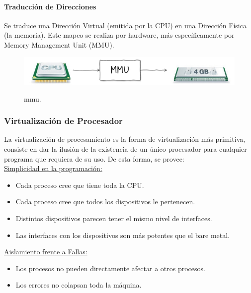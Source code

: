 \documentclass[../main.tex]{subfiles}
\begin{document}
            \paragraph*{Traducción de Direcciones}
                Se traduce una Dirección Virtual (emitida por la CPU) en una Dirección Física (la memoria). Este mapeo se realiza por hardware, más específicamente por Memory Management Unit (MMU).

                \begin{figure}[ht]
                    \centering
                    \includegraphics[scale=0.4]{../images/mmu.jpg}
                    \label{fig:direccion}
                    \caption{mmu.}
                \end{figure}

        \subsubsection*{Virtualización de Procesador}
            La virtualización de procesamiento es la forma de virtualización más primitiva, consiste en dar la ilusión de la existencia de un único procesador para cualquier programa que requiera de su uso. De esta forma, se provee:\\

            \underline{Simplicidad en la programación:}
            \begin{itemize}
                \item Cada proceso cree que tiene toda la CPU.
                \item Cada proceso cree que todos los dispositivos le pertenecen.
                \item Distintos dispositivos parecen tener el mismo nivel de interfaces.
                \item Las interfaces con los dispositivos son más potentes que el bare metal.
            \end{itemize}

            \underline{Aislamiento frente a Fallas:}
            \begin{itemize}
                \item Los procesos no pueden directamente afectar a otros procesos.
                \item Los errores no colapsan toda la máquina.
            \end{itemize}
\end{document}
